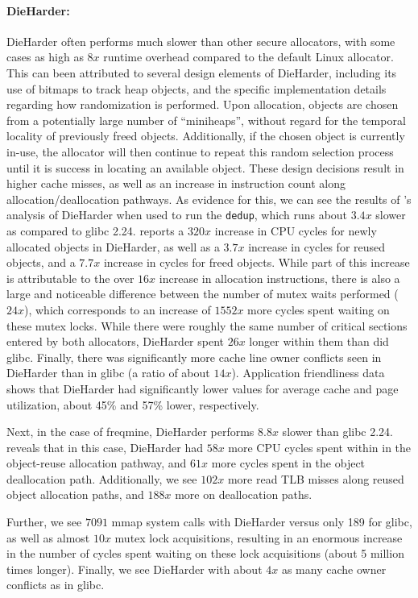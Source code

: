 \paragraph{DieHarder:}
DieHarder often performs much slower than other secure allocators, with some cases as high as $8x$ runtime overhead compared to the default Linux allocator. This can been attributed to several design elements of DieHarder, including its use of bitmaps to track heap objects, and the specific implementation details regarding how randomization is performed. Upon allocation, objects are chosen from a potentially large number of ``miniheaps'', without regard for the temporal locality of previously freed objects. Additionally, if the chosen object is currently in-use, the allocator will then continue to repeat this random selection process until it is success in locating an available object. These design decisions result in higher cache misses, as well as an increase in instruction count along allocation/deallocation pathways.
As evidence for this, we can see the results of \MP{}'s analysis of DieHarder when used to run the \texttt{dedup}, which runs about $3.4x$ slower as compared to glibc 2.24. \MP{} reports a $320x$ increase in CPU cycles for newly allocated objects in DieHarder, as well as a $3.7x$ increase in cycles for reused objects, and a $7.7x$ increase in cycles for freed objects.
While part of this increase is attributable to the over $16x$ increase in allocation instructions, there is also a large and noticeable difference between the number of mutex waits performed ($24x$), which corresponds to an increase of $1552x$ more cycles spent waiting on these mutex locks. While there were roughly the same number of critical sections entered by both allocators, DieHarder spent $26x$ longer within them than did glibc.
Finally, there was significantly more cache line owner conflicts seen in DieHarder than in glibc (a ratio of about $14x$). Application friendliness data shows that DieHarder had significantly lower values for average cache and page utilization, about 45\% and 57\% lower, respectively.

Next, in the case of freqmine, DieHarder performs $8.8x$ slower than glibc 2.24. \MP{} reveals that in this case, DieHarder had $58x$ more CPU cycles spent within in the object-reuse allocation pathway, and $61x$ more cycles spent in the object deallocation path.
	Additionally, we see $102x$ more read TLB misses along reused object allocation paths, and $188x$ more on deallocation paths.
	
	Further, we see $7091$ mmap system calls with DieHarder versus only 189 for glibc, as well as almost $10x$ mutex lock acquisitions, resulting in an enormous increase in the number of cycles spent waiting on these lock acquisitions (about 5 million times longer).
	Finally, we see DieHarder with about $4x$ as many cache owner conflicts as in glibc.

